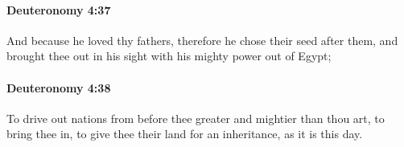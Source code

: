 		\paragraph{Deuteronomy 4:37} %
			\label{DEUTERONOMY-4-37}

			And because he loved thy fathers, therefore he chose their seed after them, and brought thee out in his sight with his mighty power out of Egypt;


		\paragraph{Deuteronomy 4:38} %
			\label{DEUTERONOMY-4-38}

			To drive out nations from before thee greater and mightier than thou art, to bring thee in, to give thee their land for an inheritance, as it is this day.


